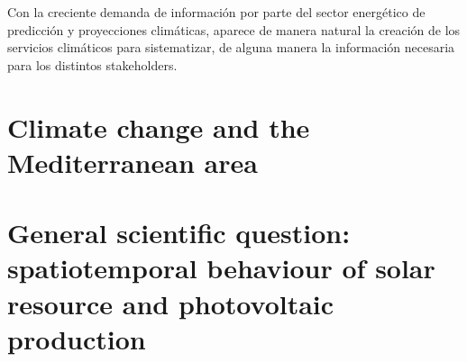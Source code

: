 Con la creciente demanda de información por parte del sector energético de predicción y proyecciones climáticas, aparece de manera natural la creación de los servicios climáticos para sistematizar, de alguna manera la información necesaria para los distintos stakeholders. 

\section{Climate change and the Mediterranean area}

\section{General scientific question: spatiotemporal behaviour of solar resource and photovoltaic production}
